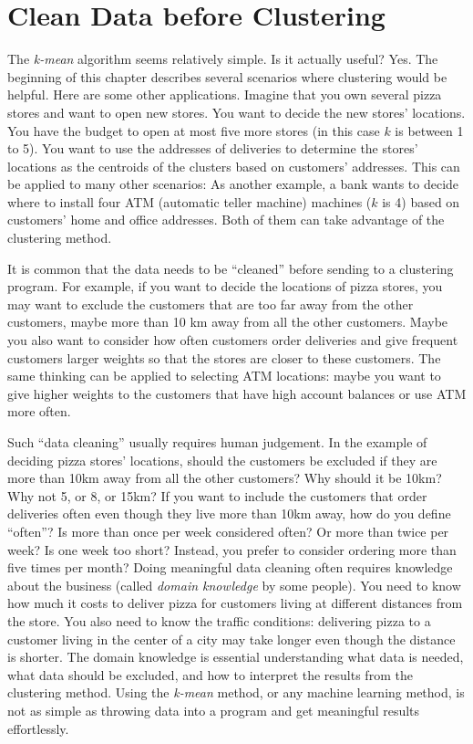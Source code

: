 
\section{Clean Data before Clustering}

The {\it k-mean} algorithm seems relatively simple. Is it actually
useful?  Yes. The beginning of this chapter describes several
scenarios where clustering would be helpful.  Here are some other
applications.  Imagine that you own several pizza stores and want to
open new stores.  You want to decide the new stores' locations.  You
have the budget to open at most five more stores (in this case $k$ is
between 1 to 5).  You want to use the addresses of deliveries to
determine the stores' locations as the centroids of the clusters based
on customers' addresses.  This can be applied to many other scenarios:
As another example, a bank wants to decide where to install four ATM
(automatic teller machine)
machines ($k$ is 4) based on customers' home and office addresses.
Both of them can take advantage of the clustering method.


It is common that the data needs to be ``cleaned'' before sending to a
clustering program.  For example, if you want to decide the locations
of pizza stores, you may want to exclude the customers that are too
far away from the other customers, maybe more than 10 km away from all
the other customers.  Maybe you also want to consider how often
customers order deliveries and give frequent customers larger weights
so that the stores are closer to these customers.  The same thinking
can be applied to selecting ATM locations: maybe you want to give
higher weights to the customers that have high account balances or use
ATM more often.

Such ``data cleaning'' usually requires human judgement. In the
example of deciding pizza stores' locations, should the customers be
excluded if they are more than 10km away from all the other customers?
Why should it be 10km? Why not 5, or 8, or 15km?  If you want to
include the customers that order deliveries often even though they
live more than 10km away, how do you define ``often''?  Is more than
once per week considered often? Or more than twice per week?  Is one
week too short? Instead, you prefer to consider ordering more than
five times per month?  Doing meaningful data cleaning often requires
knowledge about the business (called {\it domain knowledge} by some
people). You need to know how much it costs to deliver pizza for
customers living at different distances from the store. You also need
to know the traffic conditions: delivering pizza to a customer living
in the center of a city may take longer even though the distance is
shorter.  The domain knowledge is essential understanding what data is
needed, what data should be excluded, and how to interpret the results
from the clustering method.  Using the {\it k-mean} method, or any
machine learning method, is not as simple as throwing data into a
program and get meaningful results effortlessly.



